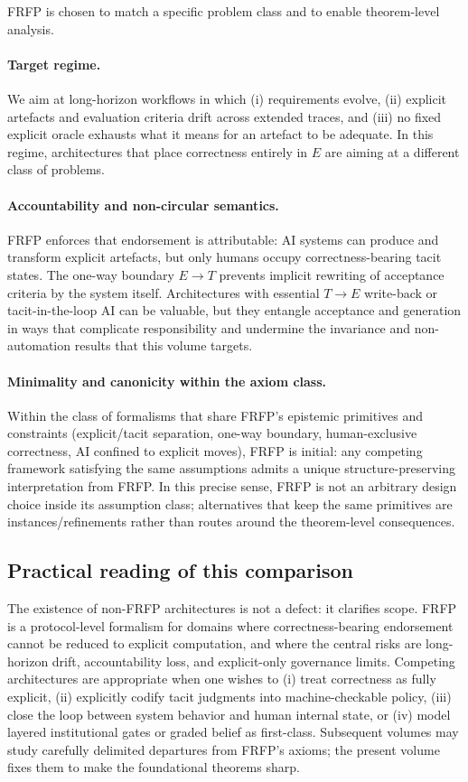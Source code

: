 FRFP is chosen to match a specific problem class and to enable theorem-level analysis.

\paragraph{Target regime.}
We aim at long-horizon workflows in which (i) requirements evolve, (ii) explicit artefacts and
evaluation criteria drift across extended traces, and (iii) no fixed explicit oracle exhausts what it
means for an artefact to be adequate. In this regime, architectures that place correctness entirely in
\(E\) are aiming at a different class of problems.

\paragraph{Accountability and non-circular semantics.}
FRFP enforces that endorsement is attributable: AI systems can produce and transform explicit
artefacts, but only humans occupy correctness-bearing tacit states. The one-way boundary \(E\to T\)
prevents implicit rewriting of acceptance criteria by the system itself. Architectures with essential
\(T\to E\) write-back or tacit-in-the-loop AI can be valuable, but they entangle acceptance and
generation in ways that complicate responsibility and undermine the invariance and non-automation
results that this volume targets.

\paragraph{Minimality and canonicity within the axiom class.}
Within the class of formalisms that share FRFP's epistemic primitives and constraints (explicit/tacit
separation, one-way boundary, human-exclusive correctness, AI confined to explicit moves), FRFP is
initial: any competing framework satisfying the same assumptions admits a unique structure-preserving
interpretation from FRFP. In this precise sense, FRFP is not an arbitrary design choice inside its
assumption class; alternatives that keep the same primitives are instances/refinements rather than
routes around the theorem-level consequences.

\subsection{Practical reading of this comparison}

The existence of non-FRFP architectures is not a defect: it clarifies scope. FRFP is a protocol-level
formalism for domains where correctness-bearing endorsement cannot be reduced to explicit computation,
and where the central risks are long-horizon drift, accountability loss, and explicit-only governance
limits. Competing architectures are appropriate when one wishes to (i) treat correctness as fully
explicit, (ii) explicitly codify tacit judgments into machine-checkable policy, (iii) close the loop
between system behavior and human internal state, or (iv) model layered institutional gates or graded
belief as first-class. Subsequent volumes may study carefully delimited departures from FRFP's axioms;
the present volume fixes them to make the foundational theorems sharp.
